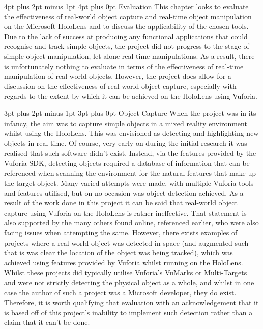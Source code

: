 \documentclass[12pt,a4paper,oneside]{article}
\makeatletter
\renewcommand\subsection{\@startsection {subsection}{1}{0mm} %
                               {3pt plus 2pt minus 1pt} %
                               {3pt plus 0pt} %
                               {\large\bfseries}}
\renewcommand\section{\@startsection {section}{1}{0mm} %
                               {4pt plus 2pt minus 1pt} %
                               {4pt plus 0pt} %
                               {\Large\bfseries}}
\makeatother
\begin{document}
\newpage
\section{Evaluation}
This chapter looks to evaluate the effectiveness of real-world object capture and real-time object manipulation on the Microsoft HoloLens and to discuss the applicability of the chosen tools. Due to the lack of success at producing any functional applications that could recognise and track simple objects, the project did not progress to the stage of simple object manipulation, let alone real-time manipulations. As a result, there is unfortunately nothing to evaluate in terms of the effectiveness of real-time manipulation of real-world objects. However, the project does allow for a discussion on the effectiveness of real-world object capture, especially with regards to the extent by which it can be achieved on the HoloLens using Vuforia.

\subsection{Object Capture}
When the project was in its infancy, the aim was to capture simple objects in a mixed reality environment whilst using the HoloLens. This was envisioned as detecting and highlighting new objects in real-time. Of course, very early on during the initial research it was realised that such software didn't exist. Instead, via the features provided by the Vuforia SDK, detecting objects required a database of information that can be referenced when scanning the environment for the natural features that make up the target object. Many varied attempts were made, with multiple Vuforia tools and features utilised, but on no occasion was object detection achieved. As a result of the work done in this project it can be said that real-world object capture using Vuforia on the HoloLens is rather ineffective. That statement is also supported by the many others found online, referenced earlier, who were also facing issues when attempting the same. However, there exists examples of projects where a real-world object was detected in space (and augmented such that is was clear the location of the object was being tracked), which was achieved using features provided by Vuforia whilst running on the HoloLens. Whilst these projects did typically utilise Vuforia's VuMarks or Multi-Targets and were not strictly detecting the physical object as a whole, and whilst in one case the author of such a project was a Microsoft developer, they do exist. Therefore, it is worth qualifying that evaluation with an acknowledgement that it is based off of this project's inability to implement such detection rather than a claim that it can't be done.
\end{document}
